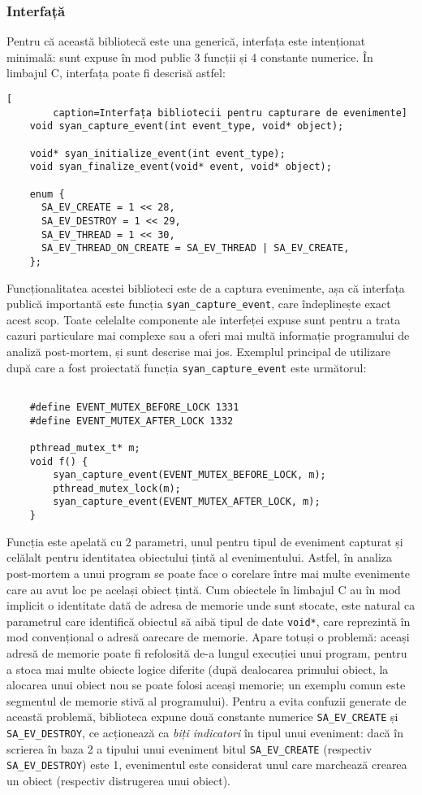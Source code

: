 \subsubsection{Interfață}\label{section:library-interface}
Pentru că această bibliotecă este una generică, interfața este
intenționat minimală: sunt expuse în mod public 3 funcții și 4
constante numerice. În limbajul C, interfața poate fi descrisă astfel:
\begin{lstlisting}[
        caption=Interfața bibliotecii pentru capturare de evenimente]
    void syan_capture_event(int event_type, void* object);

    void* syan_initialize_event(int event_type);
    void syan_finalize_event(void* event, void* object);

    enum {
      SA_EV_CREATE = 1 << 28,
      SA_EV_DESTROY = 1 << 29,
      SA_EV_THREAD = 1 << 30,
      SA_EV_THREAD_ON_CREATE = SA_EV_THREAD | SA_EV_CREATE,
    };
\end{lstlisting}
Funcționalitatea acestei biblioteci este de a captura evenimente, așa
că interfața publică importantă este funcția
\lstinline{syan_capture_event}, care îndeplinește exact acest scop.
Toate celelalte componente ale interfeței expuse sunt pentru a trata
cazuri particulare mai complexe sau a oferi mai multă informație
programului de analiză post-mortem, și sunt descrise mai jos. Exemplul
principal de utilizare după care a fost proiectată funcția
\lstinline{syan_capture_event} este următorul:
\begin{lstlisting}[caption=Exemplul folosit în proiectarea interfeței]

    #define EVENT_MUTEX_BEFORE_LOCK 1331
    #define EVENT_MUTEX_AFTER_LOCK 1332

    pthread_mutex_t* m;
    void f() {
        syan_capture_event(EVENT_MUTEX_BEFORE_LOCK, m);
        pthread_mutex_lock(m);
        syan_capture_event(EVENT_MUTEX_AFTER_LOCK, m);
    }
\end{lstlisting}
Funcția este apelată cu 2 parametri, unul pentru tipul de eveniment
capturat și celălalt pentru identitatea obiectului țintă al
evenimentului. Astfel, în analiza post-mortem a unui program se poate
face o corelare între mai multe evenimente care au avut loc pe același
obiect țintă. Cum obiectele în limbajul C au în mod implicit o
identitate dată de adresa de memorie unde sunt stocate, este natural ca
parametrul care identifică obiectul să aibă tipul de date
\lstinline{void*}, care reprezintă în mod convențional o adresă oarecare
de memorie. Apare totuși o problemă: aceași adresă de memorie poate fi
refolosită de-a lungul execuției unui program, pentru a stoca mai multe
obiecte logice diferite (după dealocarea primului obiect, la alocarea
unui obiect nou se poate folosi aceași memorie; un exemplu comun este
segmentul de memorie stivă al programului). Pentru a evita confuzii
generate de această problemă, biblioteca expune două constante numerice
\lstinline{SA_EV_CREATE} și \lstinline{SA_EV_DESTROY}, ce acționează ca
\textit{biți indicatori} în tipul unui eveniment: dacă în scrierea în
baza 2 a tipului unui eveniment bitul \lstinline{SA_EV_CREATE}
(respectiv \lstinline{SA_EV_DESTROY}) este 1, evenimentul este
considerat unul care marchează crearea un obiect (respectiv distrugerea
unui obiect).


